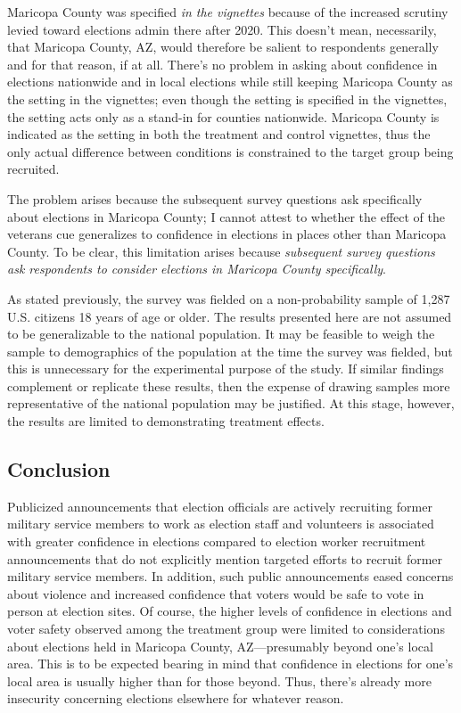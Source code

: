 \documentclass[
  12pt,
  letterpaper,
]{article}
\begin{document}
Maricopa County was specified \emph{in the vignettes} because of the
increased scrutiny levied toward elections admin there after 2020. This
doesn't mean, necessarily, that Maricopa County, AZ, would therefore be
salient to respondents generally and for that reason, if at all. There's
no problem in asking about confidence in elections nationwide and in
local elections while still keeping Maricopa County as the setting in
the vignettes; even though the setting is specified in the vignettes,
the setting acts only as a stand-in for counties nationwide. Maricopa
County is indicated as the setting in both the treatment and control
vignettes, thus the only actual difference between conditions is
constrained to the target group being recruited.

The problem arises because the subsequent survey questions ask
specifically about elections in Maricopa County; I cannot attest to
whether the effect of the veterans cue generalizes to confidence in
elections in places other than Maricopa County. To be clear, this
limitation arises because \emph{subsequent survey questions ask
respondents to consider elections in Maricopa County specifically}.

As stated previously, the survey was fielded on a non-probability sample
of 1,287 U.S. citizens 18 years of age or older. The results presented
here are not assumed to be generalizable to the national population. It
may be feasible to weigh the sample to demographics of the population at
the time the survey was fielded, but this is unnecessary for the
experimental purpose of the study. If similar findings complement or
replicate these results, then the expense of drawing samples more
representative of the national population may be justified. At this
stage, however, the results are limited to demonstrating treatment
effects.

\subsection{Conclusion}\label{conclusion}

Publicized announcements that election officials are actively recruiting
former military service members to work as election staff and volunteers
is associated with greater confidence in elections compared to election
worker recruitment announcements that do not explicitly mention targeted
efforts to recruit former military service members. In addition, such
public announcements eased concerns about violence and increased
confidence that voters would be safe to vote in person at election
sites. Of course, the higher levels of confidence in elections and voter
safety observed among the treatment group were limited to considerations
about elections held in Maricopa County, AZ---presumably beyond one's
local area. This is to be expected bearing in mind that confidence in
elections for one's local area is usually higher than for those beyond.
Thus, there's already more insecurity concerning elections elsewhere for
whatever reason.
\end{document}
